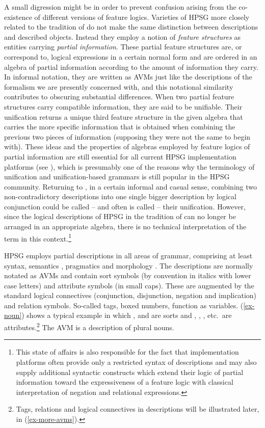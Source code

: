 \documentclass[output=paper
 	        ,biblatex
                ,babelshorthands
                ,newtxmath
                ,draftmode
                ,colorlinks, citecolor=brown
]{langscibook}
\begin{document}
A small digression might be in order to prevent confusion arising from
the co-existence of different versions of feature logics.  Varieties
of HPSG more closely related to the tradition of \cite{PollardSag1987}
do not make the same distinction between descriptions and described
objects. Instead they employ a notion of \emph{feature structures} as
entities carrying \emph{partial information}. These partial feature
structures are, or correspond to, logical expressions in a certain
normal form and are ordered in an algebra of partial information
according to the amount of information they carry. In informal
notation, they are written as AVMs just like the descriptions of the
formalism we are presently concerned with, and this notational
similarity contributes to obscuring substantial differences.  When two
partial feature structures carry compatible information, they are said
to be unifiable. Their unification returns a unique third feature
structure in the given algebra that carries the more specific
information that is obtained when combining the previous two pieces of
information (supposing they were not the same to begin with). These ideas and the
properties of algebras employed by feature logics of partial information are
still essential for all current HPSG implementation platforms (see ), which
is presumably one of the reasons why the terminology of unification
and unification-based grammars is still popular in the HPSG
community. Returning to \cite{PollardSag1994}, in a certain
informal and casual sense, combining two non-contradictory descriptions
into one single bigger description by logical conjunction could be
called -- and often is called -- their unification. However, since the
logical descriptions of HPSG in the tradition of \cite{PollardSag1994}
can no longer be arranged in an appropriate algebra, there is no
technical interpretation of the term in this context.\footnote{This
  state of affairs is also responsible for the fact that
  implementation platforms often provide only a restricted syntax of
  descriptions and may also supply additional syntactic constructs which
  extend their logic of partial information toward the expressiveness of
  a feature logic with classical interpretation of negation and
  relational expressions.}

HPSG employs partial descriptions in all areas of grammar, comprising
at least syntax, semantics , pragmatics  and morphology . The
descriptions are normally notated as AVMs and contain sort symbols (by
convention in italics with lower case letters) and attribute symbols
(in small caps). These are augmented by the standard
logical connectives (conjunction, disjunction, negation and
implication) and relation symbols. So-called tags, boxed
numbers, function as variables. (\ref{ex-noun}) shows a typical example
in which ,  and  are sorts and
, , , etc.\ are attributes.\footnote{Tags, relations and logical connectives in descriptions will be illustrated later, in (\ref{ex-more-avms}).}
The AVM is a description of plural nouns.
\end{document}

